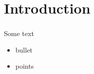 \section{Introduction}

\begin{frame}
    \frametitle{\insertsection}
    Some text
    \vspace{1em}
    \begin{itemize}
        \setlength\itemsep{1em}
        \item bullet
        \item points
    \end{itemize}
\end{frame}